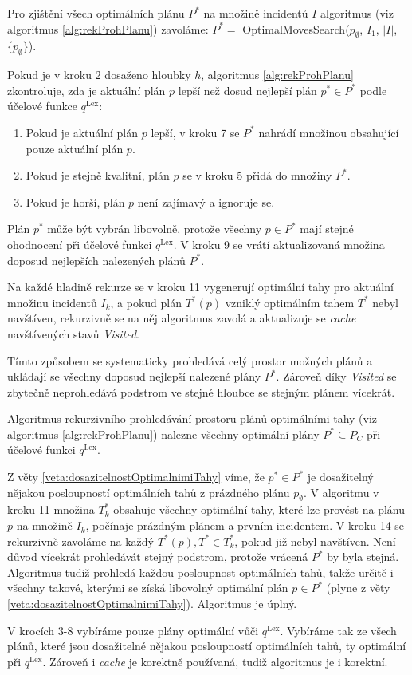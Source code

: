 Pro zjištění všech optimálních plánu $P^*$ na množině incidentů $I$ algoritmus (viz algoritmus \ref{alg:rekProhPlanu}) zavoláme: $P^* = $ OptimalMovesSearch($p_{\emptyset}$, $I_1$, $|I|$, $\{ p_{\emptyset} \}$).

Pokud je v kroku 2 dosaženo hloubky $h$, algoritmus \ref{alg:rekProhPlanu} zkontroluje, zda je aktuální plán $p$ lepší než dosud nejlepší plán $p^* \in P^*$ podle účelové funkce $q^{\text{Lex}}$:
\begin{enumerate}
  \item Pokud je aktuální plán $p$ lepší, v kroku 7 se $P^*$ nahrádí množinou obsahující pouze aktuální plán $p$. 
  \item Pokud je stejně kvalitní, plán $p$ se v kroku 5 přidá do množiny $P^*$.
  \item Pokud je horší, plán $p$ není zajímavý a ignoruje se.
\end{enumerate}
Plán $p^*$ může být vybrán libovolně, protože všechny $p \in P^*$ mají stejné ohodnocení při účelové funkci $q^{\text{Lex}}$.
V kroku 9 se vrátí aktualizovaná množina doposud nejlepších nalezených plánů $P^*$.

Na každé hladině rekurze se v kroku 11 vygenerují optimální tahy pro aktuální množinu incidentů $I_k$, a pokud plán $T^*(p)$ vzniklý optimálním tahem $T^*$ nebyl navštíven,
rekurzivně se na něj algoritmus zavolá a aktualizuje se \textit{cache} navštívených stavů \textit{Visited}.

Tímto způsobem se systematicky prohledává celý prostor možných plánů a ukládají se všechny doposud nejlepší nalezené plány $P^*$.
Zároveň díky \textit{Visited} se zbytečně neprohledává podstrom ve stejné hloubce se stejným plánem vícekrát.

\begin{veta}\label{}
  Algoritmus rekurzivního prohledávání prostoru plánů optimálními tahy (viz algoritmus \ref{alg:rekProhPlanu}) nalezne všechny optimální plány $P^* \subseteq P_C$ při účelové funkci $q^{\text{Lex}}$.
\end{veta}
\begin{dukaz}
  Z věty \ref{veta:dosazitelnostOptimalnimiTahy} víme, že $p^* \in P^*$ je dosažitelný nějakou posloupností optimálních tahů z prázdného plánu $p_{\emptyset}$. 
  V algoritmu v kroku 11 množina $T^*_k$ obsahuje všechny optimální tahy, které lze provést na plánu $p$ na množině $I_k$, počínaje prázdným plánem a prvním incidentem.
  V kroku 14 se rekurzivně zavoláme na každý $T^*(p), T^* \in T^*_k$, pokud již nebyl navštíven.
  Není důvod vícekrát prohledávát stejný podstrom, protože vrácená $P^*$ by byla stejná.
  Algoritmus tudiž prohledá každou posloupnost optimálních tahů, takže určitě i všechny takové, kterými se získá libovolný optimální plán $p \in P^*$ (plyne z věty \ref{veta:dosazitelnostOptimalnimiTahy}).
  Algoritmus je úplný.

  V krocích 3-8 vybíráme pouze plány optimální vůči $q^{\text{Lex}}$.
  Vybíráme tak ze všech plánů, které jsou dosažitelné nějakou posloupností optimálních tahů, ty optimální při $q^{\text{Lex}}$.
  Zároveň i \textit{cache} je korektně používaná, tudiž algoritmus je i korektní.
\end{dukaz}

